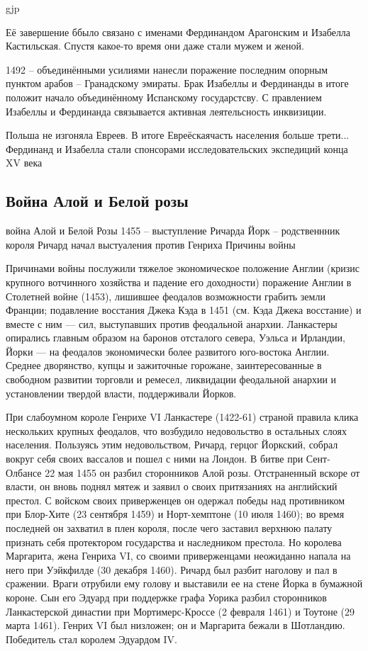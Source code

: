 gjp	 \documentclass[12pt,a4paper]{article}
\begin{document}
Её завершение ббыло связано с именами Фердинандом Арагонским и Изабелла Кастильская. Спустя какое-то время они даже стали мужем и женой.

1492 -- объединёнными усилиями нанесли поражение последним опорным пунктом арабов -- Гранадскому эмираты. Брак Изабеллы и Фердинанды в итоге положит начало объединённому Испанскому государстсву. С правлением Изабеллы и Фердинанда связывается активная леятельсность инквизиции. 

Польша не изгоняла Евреев. В итоге Евреёскаячасть населения больше трети... Фердинанд и Изабелла стали спонсорами исследовательских экспедиций конца XV века

\subsection{Война Алой и Белой розы}


война Алой и Белой Розы
1455 -- выступление Ричарда Йорк -- родственнник короля
Ричард начал выстуаления против Генриха
Причины войны

Причинами войны послужили тяжелое экономическое положение Англии (кризис крупного вотчинного хозяйства и падение его доходности) поражение Англии в Столетней войне (1453), лишившее феодалов возможности грабить земли Франции; подавление восстания Джека Кэда в 1451 (см. Кэда Джека восстание) и вместе с ним — сил, выступавших против феодальной анархии. Ланкастеры опирались главным образом на баронов отсталого севера, Уэльса и Ирландии, Йорки — на феодалов экономически более развитого юго-востока Англии. Среднее дворянство, купцы и зажиточные горожане, заинтересованные в свободном развитии торговли и ремесел, ликвидации феодальной анархии и установлении твердой власти, поддерживали Йорков.

При слабоумном короле Генрихе VI Ланкастере (1422-61) страной правила клика нескольких крупных феодалов, что возбудило недовольство в остальных слоях населения. Пользуясь этим недовольством, Ричард, герцог Йоркский, собрал вокруг себя своих вассалов и пошел с ними на Лондон. В битве при Сент-Олбансе 22 мая 1455 он разбил сторонников Алой розы. Отстраненный вскоре от власти, он вновь поднял мятеж и заявил о своих притязаниях на английский престол. С войском своих приверженцев он одержал победы над противником при Блор-Хите (23 сентября 1459) и Норт-хемптоне (10 июля 1460); во время последней он захватил в плен короля, после чего заставил верхнюю палату признать себя протектором государства и наследником престола. Но королева Маргарита, жена Генриха VI, со своими приверженцами неожиданно напала на него при Уэйкфилде (30 декабря 1460). Ричард был разбит наголову и пал в сражении. Враги отрубили ему голову и выставили ее на стене Йорка в бумажной короне. Сын его Эдуард при поддержке графа Уорика разбил сторонников Ланкастерской династии при Мортимерс-Кроссе (2 февраля 1461) и Тоутоне (29 марта 1461). Генрих VI был низложен; он и Маргарита бежали в Шотландию. Победитель стал королем Эдуардом IV.
\end{document}
